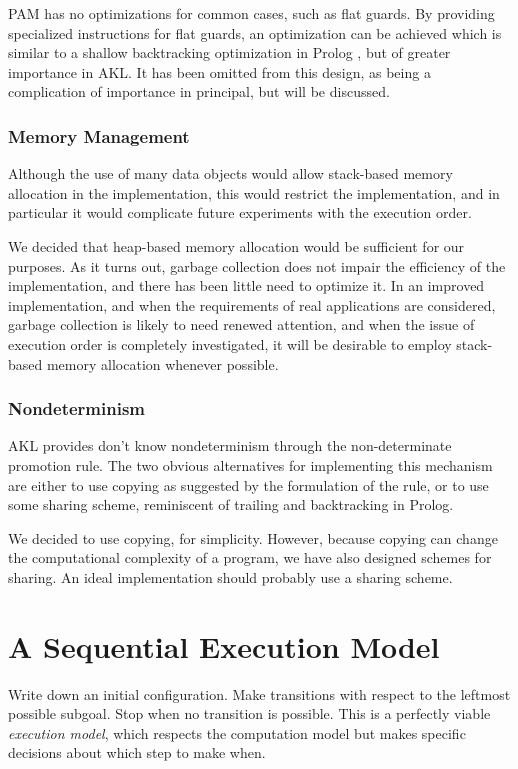 PAM has no optimizations for common cases, such as flat guards.  By
providing specialized instructions for flat guards, an optimization
can be achieved which is similar to a shallow backtracking
optimization in Prolog \cite{shallow}, but of greater importance in
AKL.  It has been omitted from this design, as being a complication of
importance in principal, but will be discussed.

\subsection{Memory Management}

Although the use of many data objects would allow stack-based memory
allocation in the implementation, this would restrict the
implementation, and in particular it would complicate future
experiments with the execution order.

We decided that heap-based memory allocation would be sufficient for
our purposes.  As it turns out, garbage collection does not impair the
efficiency of the implementation, and there has been little need to
optimize it.  In an improved implementation, and when the requirements
of real applications are considered, garbage collection is likely to
need renewed attention, and when the issue of execution order is
completely investigated, it will be desirable to employ stack-based
memory allocation whenever possible.

\subsection{Nondeterminism}

AKL provides don't know nondeterminism through the non-determinate
promotion rule.  The two obvious alternatives for implementing this
mechanism are either to use copying as suggested by the formulation of
the rule, or to use some sharing scheme, reminiscent of trailing and
backtracking in Prolog.

We decided to use copying, for simplicity.  However, because copying
can change the computational complexity of a program, we have also
designed schemes for sharing.  An ideal implementation should probably
use a sharing scheme.


\chapter{A Sequential Execution Model} \label{ch:exemodel}

Write down an initial configuration. Make transitions with respect to
the leftmost possible subgoal. Stop when no transition is possible.
This is a perfectly viable {\em execution model}, which respects the
computation model but makes specific decisions about which step to
make when.

